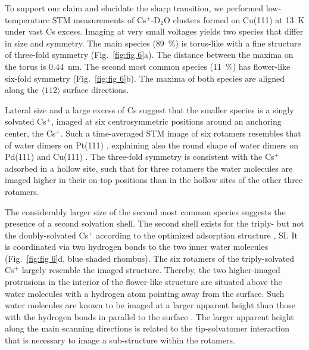 \documentclass[aps,twocolumn,amssymb,amsfonts,amsmath,showpacs,final,a4paper,superscriptaddress]{revtex4-2}
\begin{document}
To support our claim and elucidate the sharp transition, we performed low-temperature STM measurements of Cs$^+$-D$_2$O clusters formed on Cu(111) at 13~K under vast Cs excess. Imaging at very small voltages yields two species that differ in size and symmetry.
The main species (89~\%) is torus-like with a fine structure of three-fold symmetry (Fig.~\ref{fig:fig 6}a). The distance between the maxima  on the torus is 0.44~nm. The second most common species (11~\%) has flower-like six-fold symmetry (Fig.~\ref{fig:fig 6}b). The maxima of both species are aligned along the $\langle 112 \rangle$ surface directions. %

Lateral size and a large excess of Cs suggest that the smaller species is a singly solvated Cs$^+$, imaged at six centrosymmetric positions around an anchoring center, the Cs$^+$. Such a time-averaged STM image of six rotamers resembles that of water dimers on Pt(111) \cite{ Motobayashi_2008}, explaining also the round shape of water dimers on Pd(111) \cite{Ranea_2004} and Cu(111) \cite{Bertram_2019}. The three-fold symmetry is consistent with the Cs$^+$ adsorbed in a hollow site, such that for three rotamers the water molecules are imaged higher in their on-top positions than in the hollow sites of the other three rotamers.

The considerably larger size of the second most common species suggests the presence of a second solvation shell. The second shell exists for the triply- but not the doubly-solvated Cs$^+$ according to the optimized adsorption structure \cite{penschke_2023}, SI. It is coordinated via two hydrogen bonds to the two inner water molecules (Fig.~\ref{fig:fig 6}d, blue shaded rhombus). The six rotamers of the triply-solvated Cs$^+$ largely resemble the imaged structure. Thereby, the two higher-imaged protrusions in the interior of the flower-like structure are situated above the water molecules with a hydrogen atom pointing away from the surface. Such water molecules are known to be imaged at a larger apparent height than those with the hydrogen bonds in parallel to the surface \cite{morgenstern_2002,carrasco_2009}.
The larger apparent height along the main scanning directions is related to the tip-solvatomer interaction that is necessary to image a sub-structure within the rotamers.
\end{document}
